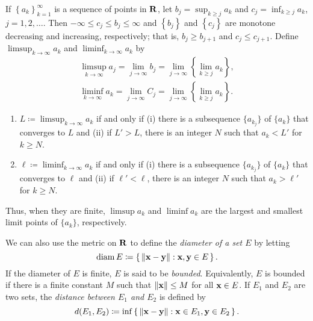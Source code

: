 If $\left\{ a_k \right\}_{k=1}^\infty$ is a sequence of points in $\mathbf{R}$,
let $b_j=\sup_{k\geq j} a_k$ and $c_j=\inf_{k\geq j} a_k$,
$j=1,2,\dotsc$. Then $-\infty\leq c_j\leq b_j\leq\infty$ and $\left\{ b_j
\right\}$ and $\left\{ c_j \right\}$ are monotone decreasing and
increasing, respectively; that is, $b_j\geq b_{j+1}$ and $c_j\leq
c_{j+1}$. Define $\limsup_{k\to\infty} a_k$ and $\liminf_{k\to\infty} a_k$
by
\begin{equation}
\label{eq:limsup-liminf-e-k}
\begin{aligned}
\limsup_{k\to\infty} a_j=
\lim_{j\to\infty}b_j=
\lim_{j\to\infty}\left\{\lim_{k\geq j} a_k\right\},\\
\liminf_{k\to\infty} a_k=
\lim_{j\to\infty} C_j=
\lim_{j\to\infty}\left\{\lim_{k\geq j} a_k\right\}.
\end{aligned}
\end{equation}
\begin{theorem}[1.4]
\begin{enumerate}[label=\textnormal{(\alph*)}]
\item $L\coloneqq\limsup_{k\to\infty} a_k$ if and only if (i) there is a
  subsequence $\{a_{k_j}\}$ of $\{a_k\}$ that   converges to $L$ and (ii)
  if $L'>L$, there is an integer $N$ such that $a_k<L'$ for $k\geq N$.
\item $\ell\coloneqq\liminf_{k\to\infty} a_k$ if and only if (i) there is a
  subsequence $\{a_{k_j}\}$ of $\{a_k\}$ that converges to $\ell$ and (ii)
  if $\ell'<\ell$, there is an integer $N$ such that $a_k>\ell'$ for $k\geq
  N$.
\end{enumerate}
\end{theorem}

Thus, when they are finite, $\limsup a_k$ and $\liminf a_k$ are the
largest and smallest limit points of $\{a_k\}$, respectively.

We can also use the metric on $\mathbf{R}$ to define the \emph{diameter of a set
  $E$} by letting
\begin{equation}
  \label{eq:diameter-of-set}
\operatorname{diam} E\coloneqq\left\{\,\|\mathbf{x}-\mathbf{y}\|:\mathbf{x},\mathbf{y}\in E\,\right\}.
\end{equation}
If the diameter of $E$ is finite, $E$ is said to be
\emph{bounded}. Equivalently, $E$ is bounded if there is a finite constant
$M$ such  that $\|\mathbf{x}\|\leq M$ for all $\mathbf{x}\in E$. If $E_1$ and $E_2$ are
two sets, the \emph{distance between $E_1$ and $E_2$} is defined by
\begin{equation}
  \label{eq:distance-e-1-e-2}
d(E_1,E_2)\coloneqq\inf\left\{\,\|\mathbf{x}-\mathbf{y}\|:\mathbf{x}\in E_1,\mathbf{y}\in E_2\,\right\}.
\end{equation}

